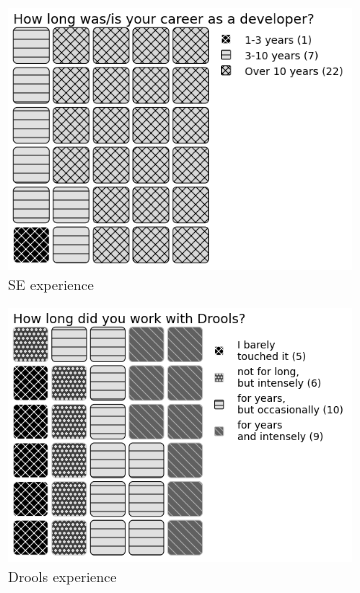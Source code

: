 \begin{figure}
\begin{subfigure}{.33\textwidth}
      \includegraphics[width=.95\linewidth]{Sections/images/pie_experiencer4.png}
      \caption{SE experience}
      \label{fig:sfig1}
    \end{subfigure}%
    \begin{subfigure}{.33\textwidth}
      \centering
      \includegraphics[width=.95\linewidth]{Sections/images/pie_droolsExperience4.png}
      \caption{Drools experience}
      \label{fig:sfig2}
    \end{subfigure}
    \begin{subfigure}{.33\textwidth}
        \centering

\end{subfigure}
\end{figure}
